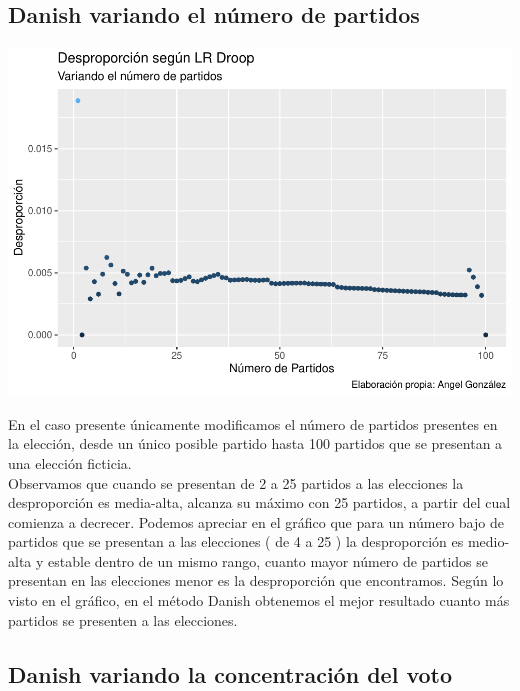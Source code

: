 \documentclass[12pt,a4paper,]{book}
\numberwithin{dummy}{section}
\theoremstyle{ocrenumbox}
\theoremstyle{blacknumex}
\theoremstyle{blacknumbox}
\theoremstyle{ocrenum}
\theoremstyle{ocrenum}
\begin{document}
\hypertarget{danish-variando-el-nuxfamero-de-partidos}{%
\subsection{Danish variando el número de
partidos}\label{danish-variando-el-nuxfamero-de-partidos}}

\begin{center}\includegraphics[width=0.95\linewidth]{figurasR/unnamed-chunk-47-1} \end{center}

En el caso presente únicamente modificamos el número de partidos
presentes en la elección, desde un único posible partido hasta 100
partidos que se presentan a una elección ficticia.\\
Observamos que cuando se presentan de 2 a 25 partidos a las elecciones
la desproporción es media-alta, alcanza su máximo con 25 partidos, a
partir del cual comienza a decrecer. Podemos apreciar en el gráfico que
para un número bajo de partidos que se presentan a las elecciones ( de 4
a 25 ) la desproporción es medio-alta y estable dentro de un mismo
rango, cuanto mayor número de partidos se presentan en las elecciones
menor es la desproporción que encontramos. Según lo visto en el gráfico,
en el método Danish obtenemos el mejor resultado cuanto más partidos se
presenten a las elecciones.

\hypertarget{danish-variando-la-concentraciuxf3n-del-voto}{%
\subsection{Danish variando la concentración del
voto}\label{danish-variando-la-concentraciuxf3n-del-voto}}
\end{document}
